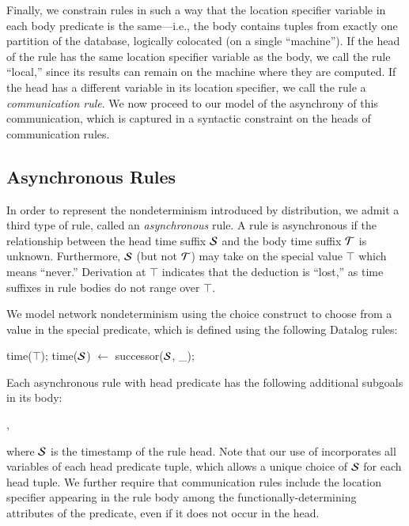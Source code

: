 Finally, we constrain \lang rules in such a way that the location specifier 
variable in each body predicate is the same---i.e., the body contains tuples from exactly one partition of the database, logically colocated (on a single ``machine'').  If the head of the rule has the same location specifier variable as the body, we call the rule ``local,'' since its results can remain on the machine where they are computed.  If the head has a different variable in its location specifier, we call the rule a {\em communication rule}.  We now proceed to our model of the asynchrony of this communication, which is captured in a syntactic constraint on the heads of communication rules.

\subsection{Asynchronous Rules}

In order to represent the nondeterminism introduced by distribution, we admit a
third type of rule, called an {\em asynchronous} rule.  A rule is asynchronous
if the 
relationship between the head time suffix $\SDedalus$ and the body time suffix $\Tau$ is
unknown.  Furthermore, $\SDedalus$ (but not $\Tau$) may take on the special value
$\top$ which means ``never.''  Derivation at $\top$ indicates that the
deduction is ``lost,'' as time suffixes in rule bodies do not range over
$\top$.

We model network nondeterminism using the choice construct to choose
from a value in the special 
predicate, which is defined using the following Datalog rules:

\begin{Dedalus}
time(\(\top\));
time(\(\SDedalus\)) \(\leftarrow\) successor(\(\SDedalus\), _);
\end{Dedalus}

\noindent
Each asynchronous rule with head predicate  has the following additional subgoals in its
body:

, 

\noindent
where
$\SDedalus$ is the timestamp of the rule head.  Note that our use of  incorporates all variables of each head predicate tuple, which allows a unique choice of $\SDedalus$ for each head tuple.  We further require that
communication rules include the location specifier appearing in the rule body 
among the functionally-determining attributes of the  predicate,
even if it does not occur in the head.


